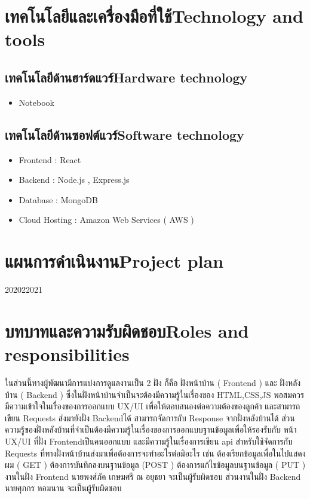 \section{\ifcpe เทคโนโลยีและเครื่องมือที่ใช้\else Technology and tools\fi}

\subsection{\ifcpe เทคโนโลยีด้านฮาร์ดแวร์\else Hardware technology\fi}
\begin{itemize}
    \item Notebook
\end{itemize}

\subsection{\ifcpe เทคโนโลยีด้านซอฟต์แวร์\else Software technology\fi}
\begin{itemize}
    \item Frontend : React 	
    \item Backend : Node.js , Express.js 
    \item Database : MongoDB
    \item Cloud Hosting : Amazon Web Services ( AWS )
\end{itemize}



\section{\ifcpe แผนการดำเนินงาน\else Project plan\fi}

\begin{plan}{6}{2020}{2}{2021}
\end{plan}

\section{\ifcpe บทบาทและความรับผิดชอบ\else Roles and responsibilities\fi}
ในส่วนนี้ทางผู้พัฒนามีการแบ่งการดูแลงานเป็น 2 ฝั่ง ก็คือ ฝั่งหน้าบ้าน 
( Frontend ) และ ฝั่งหลังบ้าน ( Backend ) ซึ่งในฝั่งหน้าบ้านจำเป็นจะต้องมีความรู้ในเรื่องของ HTML,CSS,JS พอสมควร มีความเข้าใจในเรื่องของการออกแบบ UX/UI เพื่อให้ตอบสนองต่อความต้องของลูกค้า และสามารถเขียน Requests ส่งมายังฝั่ง Backendได้ สามารถจัดการกับ Response จากฝั่งหลังบ้านได้ ส่วนความรู้ของฝั่งหลังบ้านที่จำเป็นต้องมีความรู้ในเรื่องของการออกแบบฐานข้อมูลเพื่อให้รองรับกับ หน้า UX/UI ที่ฝั่ง Frontendเป็นคนออกแบบ และมีความรู้ในเรื่องการเขียน api สำหรับใช้จัดการกับ Requests ที่ทางฝั่งหน้าบ้านส่งมาเพื่อต้องการจะทำอะไรต่อมิอะไร เช่น ต้องเรียกข้อมูลเพื่อในไปแสดงผม ( GET )
ต้องการบันทึกลงบนฐานข้อมูล (POST ) ต้องการแก้ไขข้อมูลบนฐานข้อมูล ( PUT )
งานในฝั่ง Frontend นายพงศ์ภัค เกษมศรี ณ อยุธยา จะเป็นผู้รับผิดชอบ 
ส่วนงานในฝั่ง Backend นายศุภกร หอมนาน  จะเป็นผู้รับผิดชอบ


